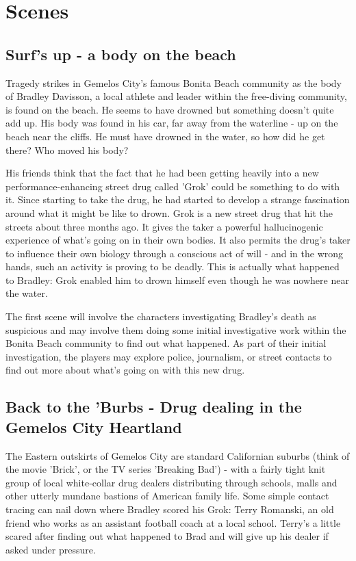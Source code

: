 \documentclass[letterpaper,serif]{rpg-module}
\begin{document}
\section{Scenes}

\subsection{Surf's up - a body on the beach}

Tragedy strikes in Gemelos City's famous Bonita Beach community as the body of Bradley Davisson, a local athlete and leader within the free-diving community, is found on the beach. He seems to have drowned but something doesn't quite add up. His body was found in his car, far away from the waterline - up on the beach near the cliffs. He must have drowned in the water, so how did he get there? Who moved his body?

His friends think that the fact that he had been getting heavily into a new performance-enhancing street drug called 'Grok' could be something to do with it. Since starting to take the drug, he had started to develop a strange fascination around what it might be like to drown. Grok is a new street drug that hit the streets about three months ago. It gives the taker a powerful hallucinogenic experience of what's going on in their own bodies. It also permits the drug's taker to influence their own biology through a conscious act of will - and in the wrong hands, such an activity is proving to be deadly. This is actually what happened to Bradley: Grok enabled him to drown himself even though he was nowhere near the water.  

The first scene will involve the characters investigating Bradley's death as suspicious and may involve them doing some initial investigative work within the Bonita Beach community to find out what happened. As part of their initial investigation, the players may explore police, journalism, or street contacts to find out more about what's going on with this new drug. 

\subsection{ Back to the 'Burbs - Drug dealing in the Gemelos City Heartland}

The Eastern outskirts of Gemelos City are standard Californian suburbs (think of the movie 'Brick', or the TV series 'Breaking Bad') - with a fairly tight knit group of local white-collar drug dealers distributing through schools, malls and other utterly mundane bastions of American family life. Some simple contact tracing can nail down where Bradley scored his Grok: Terry Romanski, an old friend who works as an assistant football coach at a local school. Terry's a little scared after finding out what happened to Brad and will give up his dealer if asked under pressure. 
\end{document}
